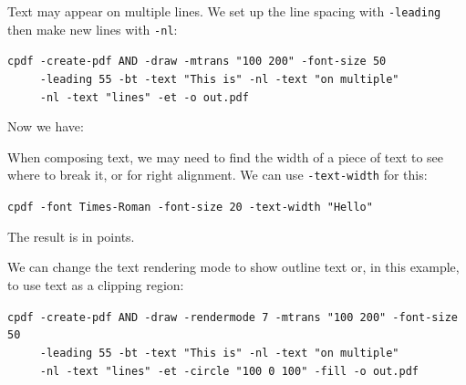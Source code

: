 \documentclass{book}
\begin{document}
\noindent Text may appear on multiple lines. We set up the line spacing with \texttt{-leading} then make new lines with \texttt{-nl}:

\begin{framed}
 \noindent\small\verb?cpdf -create-pdf AND -draw -mtrans "100 200" -font-size 50?\\
 \noindent\small\verb?     -leading 55 -bt -text "This is" -nl -text "on multiple"?\\
 \noindent\small\verb?     -nl -text "lines" -et -o out.pdf?
\end{framed}

\noindent Now we have:

\bigskip
{}
\bigskip

\noindent When composing text, we may need to find the width of a piece of text to see where to break it, or for right alignment. We can use \texttt{-text-width} for this:

\begin{framed}
 \noindent\small\verb?cpdf -font Times-Roman -font-size 20 -text-width "Hello"?
\end{framed}

\noindent The result is in points.

We can change the text rendering mode to show outline text or, in this example, to use text as a clipping region:

\begin{framed}
 \noindent\small\verb?cpdf -create-pdf AND -draw -rendermode 7 -mtrans "100 200" -font-size 50?\\
 \noindent\small\verb?     -leading 55 -bt -text "This is" -nl -text "on multiple"?\\
 \noindent\small\verb?     -nl -text "lines" -et -circle "100 0 100" -fill -o out.pdf?
\end{framed}

\bigskip
{}
\bigskip
\end{document}
